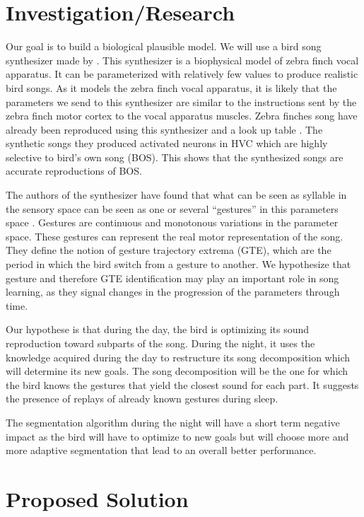 \documentclass[a4paper]{article}
\begin{document}
\begin{multicols}{2}
\section*{Investigation/Research}

Our goal is to build a biological plausible model. We will use a bird song
synthesizer made by \textcite{boari_automatic_2015}. This synthesizer is a
biophysical model of zebra finch vocal apparatus. It can be parameterized with
relatively few values to produce realistic bird songs. As it models the zebra
finch vocal apparatus, it is likely that the parameters we send to this
synthesizer are similar to the instructions sent by the zebra finch motor cortex
to the vocal apparatus muscles. Zebra finches song have already been reproduced
using this synthesizer and a look up table \parencite{boari_automatic_2015}. The
synthetic songs they produced activated neurons in HVC which are highly
selective to bird's own song (BOS). This shows that the synthesized songs are
accurate reproductions of BOS.

The authors of the synthesizer have found that what can be seen as syllable in
the sensory space can be seen as one or several ``gestures'' in this parameters
space \parencite{amador_low_2014, boari_automatic_2015}. Gestures are continuous
and monotonous variations in the parameter space. These gestures can represent
the real motor representation of the song. They define the notion of gesture
trajectory extrema (GTE), which are the period in which the bird switch from a
gesture to another. We hypothesize that gesture and therefore GTE identification
may play an important role in song learning, as they signal changes in the
progression of the parameters through time.

Our hypothese is that during the day, the bird is optimizing its sound
reproduction toward subparts of the song. During the night, it uses the
knowledge acquired during the day to restructure its song decomposition which
will determine its new goals. The song decomposition will be the one for which
the bird knows the gestures that yield the closest sound for each part. It
suggests the presence of replays of already known gestures during sleep.

The segmentation algorithm during the night will have a short term negative
impact as the bird will have to optimize to new goals but will
choose more and more adaptive segmentation that lead to an overall better
performance.

\section*{Proposed Solution}


\end{multicols}
\end{document}
